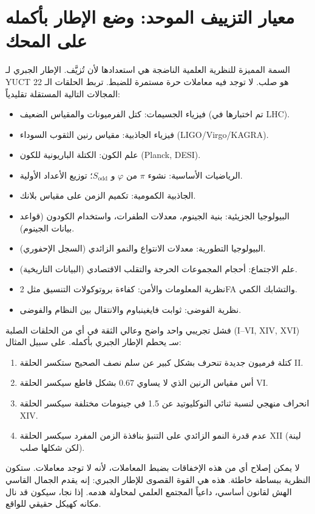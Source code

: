 \documentclass[12pt,a4paper]{article}
\begin{document}
	\section*{معيار التزييف الموحد: وضع الإطار بأكمله على المحك}
	
	السمة المميزة للنظرية العلمية الناضجة هي استعدادها لأن تُزيَّف. الإطار الجبري لـ YUCT هو صلب. لا توجد فيه معاملات حرة مستمرة للضبط. تربط الحلقات الـ 22 المجالات التالية المستقلة تقليدياً:
	\begin{itemize}
		\item فيزياء الجسيمات: كتل الفرميونات والمقياس الضعيف (تم اختبارها في LHC).
		\item فيزياء الجاذبية: مقياس رنين الثقوب السوداء (LIGO/Virgo/KAGRA).
		\item علم الكون: الكتلة الباريونية للكون (Planck, DESI).
		\item الرياضيات الأساسية: نشوء \(\pi\) من \(\varphi\) و \(S_{\mathrm{odd}}\)؛ توزيع الأعداد الأولية.
		\item الجاذبية الكمومية: تكميم الزمن على مقياس بلانك.
		\item البيولوجيا الجزيئية: بنية الجينوم، معدلات الطفرات، واستخدام الكودون (قواعد بيانات الجينوم).
		\item البيولوجيا التطورية: معدلات الانتواع والنمو الزائدي (السجل الإحفوري).
		\item علم الاجتماع: أحجام المجموعات الحرجة والتقلب الاقتصادي (البيانات التاريخية).
		\item نظرية المعلومات والأمن: كفاءة بروتوكولات التنسيق مثل 2FA والتشابك الكمي.
		\item نظرية الفوضى: ثوابت فايغينباوم والانتقال بين النظام والفوضى.
	\end{itemize}
	فشل تجريبي واحد واضح وعالي الثقة في أي من الحلقات الصلبة (I–VI, XIV, XVI) سـ يحطم الإطار الجبري بأكمله. على سبيل المثال:
	\begin{enumerate}
		\item كتلة فرميون جديدة تنحرف بشكل كبير عن سلم نصف الصحيح ستكسر الحلقة II.
		\item أس مقياس الرنين الذي لا يساوي \(0.67\) بشكل قاطع سيكسر الحلقة VI.
		\item انحراف منهجي لنسبة ثنائي النوكليوتيد عن 1.5 في جينومات مختلفة سيكسر الحلقة XIV.
		\item عدم قدرة النمو الزائدي على التنبؤ بنافذة الزمن المفرد سيكسر الحلقة XII (لينة لكن شكلها صلب).
	\end{enumerate}
	لا يمكن إصلاح أي من هذه الإخفاقات بضبط المعاملات، لأنه لا توجد معاملات. ستكون النظرية ببساطة خاطئة. هذه هي القوة القصوى للإطار الجبري: إنه يقدم الجمال القاسي الهش لقانون أساسي، داعياً المجتمع العلمي لمحاولة هدمه. إذا نجا، سيكون قد نال مكانه كهيكل حقيقي للواقع.
	
\end{document}
